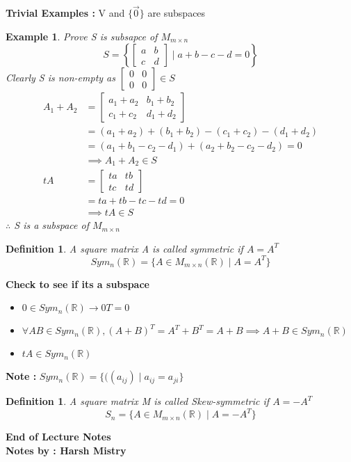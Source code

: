 \documentclass{article}
\newtheorem{ex}[theorem]{Example}
\newtheorem{definition}[theorem]{Definition}
\begin{document}
\textbf{Trivial Examples : } V and \(\{\vec{0}\}\) are subspaces
\newpage
\begin{ex}
Prove S is subsapce of \(M_{m\times n}\) 
$$ S = \left\{ \begin{bmatrix} a & b \\ c & d \end{bmatrix} \mid a + b - c - d = 0 \right\} $$
Clearly S is non-empty as \( \begin{bmatrix} 0 &  0 \\ 0 & 0 \end{bmatrix} \in S \)
 \[ \begin{aligned} A_1 + A_2 & = \begin{bmatrix} a_1 + a_2 & b_1 + b_2 \\ c_1 + c_2 & d_1 + d_2\end{bmatrix} \\ 
& = (a_1 + a_2) + (b_1 + b_2) - (c_1 + c_2) - (d_1 + d_2) \\
& = (a_1 + b_1 - c_2 - d_1) + (a_2 + b_2 - c_2 - d_2) = 0\\
& \implies A_1 + A_2 \in S \\
 tA & = \begin{bmatrix} ta & tb \\ tc & td \end{bmatrix} \\
 & = ta + tb - tc - td = 0  \\
 & \implies tA \in S \end{aligned} \]
\(\therefore\) S is a subspace of \(M_{m\times n}\)
\end{ex}

\begin{definition}
A square matrix A is called symmetric if \(A = A^T\) 
$$ Sym_n(\mathbb{R}) = \{ A \in M_{m\times n} (\mathbb{R}) \mid A = A^T \} $$
\end{definition}

\textbf{Check to see if its a subspace}
\begin{itemize}
\item \( 0 \in Sym_n(\mathbb{R}) \rightarrow 0T = 0 \)
\item \(\forall AB \in Sym_n(\mathbb{R}), (A + B)^T = A^T + B^T = A + B \implies A + B \in Sym_n(\mathbb{R}) \)
\item \(tA \in Sym_n(\mathbb{R})\)
\end{itemize}

\textbf{Note : }\(Sym_n(\mathbb{R}) = \{ ((a_{ij}) \mid a_{ij} = a_{ji} \} \)

\begin{definition}
A square matrix M is called Skew-symmetric if \(A = -A^T\)
$$ S_n = \{ A \in M_{m\times n} (\mathbb{R}) \mid A = -A^T \} $$
\end{definition}

\begin{center}
\textbf{End of Lecture Notes}\\
\textbf{Notes by : Harsh Mistry}
\end{center}
\end{document}

